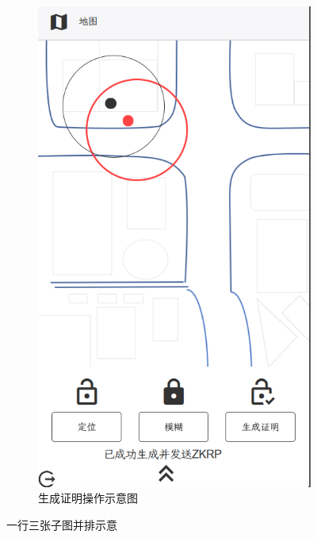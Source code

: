 \documentclass[zihao=-4]{ctexart}
\begin{document}
\begin{figure}[htbp]
  \begin{subfigure}{0.31\textwidth}
    \includegraphics[width=\linewidth]{前端-生成证明.jpg}
    \caption{生成证明操作示意图} 
    \end{subfigure}
\caption{一行三张子图并排示意}
\label{演示界面}
\end{figure}
\end{document}
